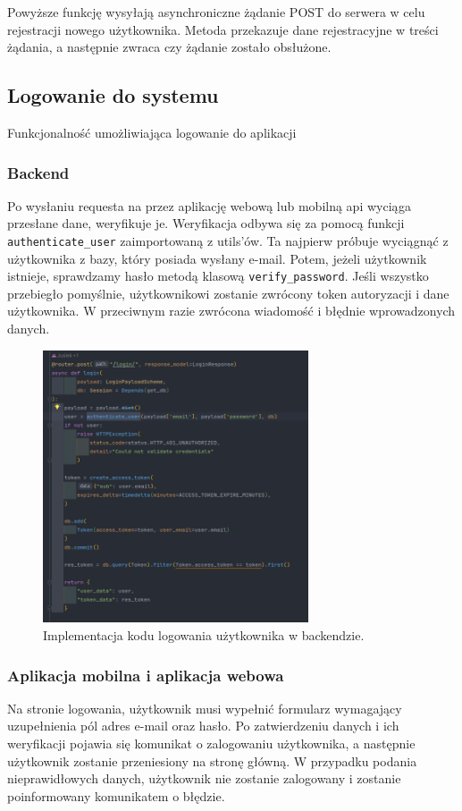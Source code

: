Powyższe funkcję wysyłają asynchroniczne żądanie POST do serwera w celu rejestracji nowego użytkownika. Metoda przekazuje dane rejestracyjne w treści żądania, a następnie zwraca czy żądanie zostało obsłużone.

\subsection{Logowanie do systemu}
Funkcjonalność umożliwiająca logowanie do aplikacji

\subsubsection{Backend}
Po wysłaniu requesta na przez aplikację webową lub mobilną api wyciąga przesłane dane, weryfikuje je.
Weryfikacja odbywa się za pomocą funkcji \texttt{authenticate\_user} zaimportowaną z utils’ów.
Ta najpierw próbuje wyciągnąć z użytkownika z bazy, który posiada wysłany e-mail. Potem, jeżeli użytkownik istnieje, sprawdzamy hasło metodą klasową \texttt{verify\_password}. Jeśli wszystko przebiegło pomyślnie, użytkownikowi zostanie zwrócony token autoryzacji i dane użytkownika. W przeciwnym razie zwrócona wiadomość i błędnie wprowadzonych danych.

\begin{figure}[H]
    \centering
    \includegraphics[width=0.7\textwidth]{chapters/chapter_8/screens/logowanie_backend}
    \caption{Implementacja kodu logowania użytkownika w backendzie.}
    \label{img:logowanie_backend}
\end{figure}

\subsubsection{Aplikacja mobilna i aplikacja webowa}
Na stronie logowania, użytkownik musi wypełnić formularz wymagający uzupełnienia pól adres e-mail oraz hasło. Po zatwierdzeniu danych i ich weryfikacji pojawia się komunikat o zalogowaniu użytkownika, a następnie użytkownik zostanie przeniesiony na stronę główną. W przypadku podania nieprawidłowych danych, użytkownik nie zostanie zalogowany i zostanie poinformowany komunikatem o błędzie.

